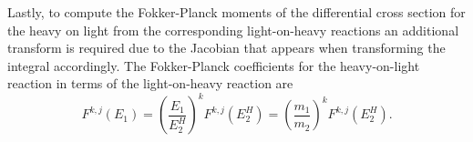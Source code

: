 Lastly, to compute the Fokker-Planck moments of the differential cross section for the heavy on light from the corresponding light-on-heavy reactions an additional transform is required due to the Jacobian that appears when transforming the integral accordingly. The Fokker-Planck coefficients for the heavy-on-light reaction in terms of the light-on-heavy reaction are
\begin{equation}
  F^{k,j}(E_1) = \left(\dfrac{E_1}{E_2^H}\right)^k F^{k,j}(E_2^H) = \left(\dfrac{m_1}{m_2}\right)^k F^{k,j}(E_2^H).
\end{equation}